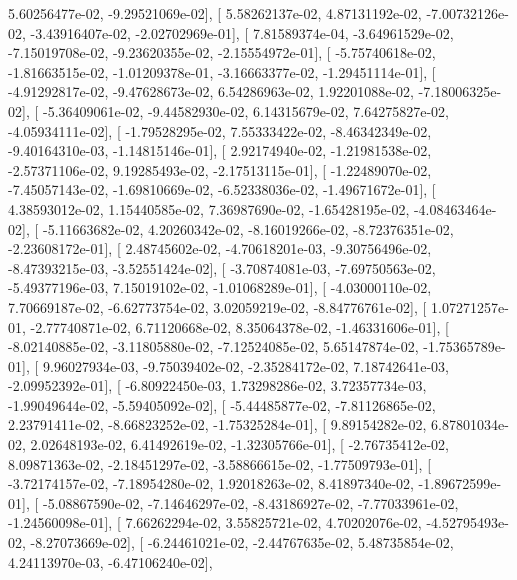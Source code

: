 \documentclass{article}
\begin{document}
          5.60256477e-02,  -9.29521069e-02],
       [  5.58262137e-02,   4.87131192e-02,  -7.00732126e-02,
         -3.43916407e-02,  -2.02702969e-01],
       [  7.81589374e-04,  -3.64961529e-02,  -7.15019708e-02,
         -9.23620355e-02,  -2.15554972e-01],
       [ -5.75740618e-02,  -1.81663515e-02,  -1.01209378e-01,
         -3.16663377e-02,  -1.29451114e-01],
       [ -4.91292817e-02,  -9.47628673e-02,   6.54286963e-02,
          1.92201088e-02,  -7.18006325e-02],
       [ -5.36409061e-02,  -9.44582930e-02,   6.14315679e-02,
          7.64275827e-02,  -4.05934111e-02],
       [ -1.79528295e-02,   7.55333422e-02,  -8.46342349e-02,
         -9.40164310e-03,  -1.14815146e-01],
       [  2.92174940e-02,  -1.21981538e-02,  -2.57371106e-02,
          9.19285493e-02,  -2.17513115e-01],
       [ -1.22489070e-02,  -7.45057143e-02,  -1.69810669e-02,
         -6.52338036e-02,  -1.49671672e-01],
       [  4.38593012e-02,   1.15440585e-02,   7.36987690e-02,
         -1.65428195e-02,  -4.08463464e-02],
       [ -5.11663682e-02,   4.20260342e-02,  -8.16019266e-02,
         -8.72376351e-02,  -2.23608172e-01],
       [  2.48745602e-02,  -4.70618201e-03,  -9.30756496e-02,
         -8.47393215e-03,  -3.52551424e-02],
       [ -3.70874081e-03,  -7.69750563e-02,  -5.49377196e-03,
          7.15019102e-02,  -1.01068289e-01],
       [ -4.03000110e-02,   7.70669187e-02,  -6.62773754e-02,
          3.02059219e-02,  -8.84776761e-02],
       [  1.07271257e-01,  -2.77740871e-02,   6.71120668e-02,
          8.35064378e-02,  -1.46331606e-01],
       [ -8.02140885e-02,  -3.11805880e-02,  -7.12524085e-02,
          5.65147874e-02,  -1.75365789e-01],
       [  9.96027934e-03,  -9.75039402e-02,  -2.35284172e-02,
          7.18742641e-03,  -2.09952392e-01],
       [ -6.80922450e-03,   1.73298286e-02,   3.72357734e-03,
         -1.99049644e-02,  -5.59405092e-02],
       [ -5.44485877e-02,  -7.81126865e-02,   2.23791411e-02,
         -8.66823252e-02,  -1.75325284e-01],
       [  9.89154282e-02,   6.87801034e-02,   2.02648193e-02,
          6.41492619e-02,  -1.32305766e-01],
       [ -2.76735412e-02,   8.09871363e-02,  -2.18451297e-02,
         -3.58866615e-02,  -1.77509793e-01],
       [ -3.72174157e-02,  -7.18954280e-02,   1.92018263e-02,
          8.41897340e-02,  -1.89672599e-01],
       [ -5.08867590e-02,  -7.14646297e-02,  -8.43186927e-02,
         -7.77033961e-02,  -1.24560098e-01],
       [  7.66262294e-02,   3.55825721e-02,   4.70202076e-02,
         -4.52795493e-02,  -8.27073669e-02],
       [ -6.24461021e-02,  -2.44767635e-02,   5.48735854e-02,
          4.24113970e-03,  -6.47106240e-02],
\end{document}
